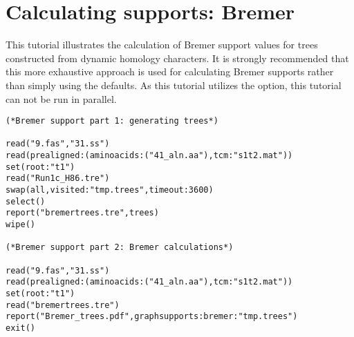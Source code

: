 


\section{Calculating supports: Bremer}{\label{tutorial4}}

This tutorial illustrates the calculation of Bremer support values 
for trees constructed from dynamic homology characters. 
It is strongly recommended that this more exhaustive approach 
is used for calculating Bremer supports rather than simply 
using the  defaults.  As this 
tutorial utilizes the  option, this 
tutorial can not be run in parallel.
    
\begin{verbatim}
(*Bremer support part 1: generating trees*)

read("9.fas","31.ss")
read(prealigned:(aminoacids:("41_aln.aa"),tcm:"s1t2.mat"))
set(root:"t1")
read("Run1c_H86.tre")
swap(all,visited:"tmp.trees",timeout:3600)
select()
report("bremertrees.tre",trees)
wipe()

(*Bremer support part 2: Bremer calculations*)

read("9.fas","31.ss")
read(prealigned:(aminoacids:("41_aln.aa"),tcm:"s1t2.mat"))
set(root:"t1")
read("bremertrees.tre")
report("Bremer_trees.pdf",graphsupports:bremer:"tmp.trees")
exit()
\end{verbatim}

